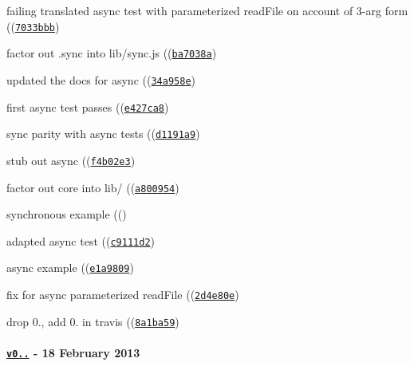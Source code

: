 \begin{DoxyItemize}
\item failing translated async test with parameterized read\+File on account of 3-\/arg form ((\href{https://github.com/browserify/resolve/commit/7033bbb6e21ecfd13476ca8de247580aa2f97e7c}{\tt {\ttfamily 7033bbb}})
\item factor out .sync into lib/sync.\+js ((\href{https://github.com/browserify/resolve/commit/ba7038a56d78212329b64287dfaf895b1a85cf2c}{\tt {\ttfamily ba7038a}})
\item updated the docs for async ((\href{https://github.com/browserify/resolve/commit/34a958e84b7fc4cdccd7b71f9a116027a6f3a123}{\tt {\ttfamily 34a958e}})
\item first async test passes ((\href{https://github.com/browserify/resolve/commit/e427ca85b7e3b1d01b05f94783b76516b8594a03}{\tt {\ttfamily e427ca8}})
\item sync parity with async tests ((\href{https://github.com/browserify/resolve/commit/d1191a9958581a040f4f18b3aecdd50714bffc7a}{\tt {\ttfamily d1191a9}})
\item stub out async ((\href{https://github.com/browserify/resolve/commit/f4b02e3bbf0c3b09f83cfb2b22b12b0f55afdf92}{\tt {\ttfamily f4b02e3}})
\item factor out core into lib/ ((\href{https://github.com/browserify/resolve/commit/a80095482ef2d16425e6e12759c9735d89f7f50b}{\tt {\ttfamily a800954}})
\item synchronous example ((\href{https://github.com/browserify/resolve/commit/3534992946294811d20aaf9857ee453078cbe828}{\tt {}})
\item adapted async test ((\href{https://github.com/browserify/resolve/commit/c9111d293ab35fb611d9c65ea2f88ae8cf853f8e}{\tt {\ttfamily c9111d2}})
\item async example ((\href{https://github.com/browserify/resolve/commit/e1a98093094cded0a251ef36f4f2eb0adb280acb}{\tt {\ttfamily e1a9809}})
\item fix for async parameterized read\+File ((\href{https://github.com/browserify/resolve/commit/2d4e80e139d01176bf70132bc80caed946cd6682}{\tt {\ttfamily 2d4e80e}})
\item drop 0., add 0. in travis ((\href{https://github.com/browserify/resolve/commit/8a1ba593ab924995a45099e164cc7b769c44e9a0}{\tt {\ttfamily 8a1ba59}})
\end{DoxyItemize}

\paragraph*{\href{https://github.com/browserify/resolve/compare/v0.2.7...v0.2.8}{\tt v0..} -\/ 18 February 2013}


